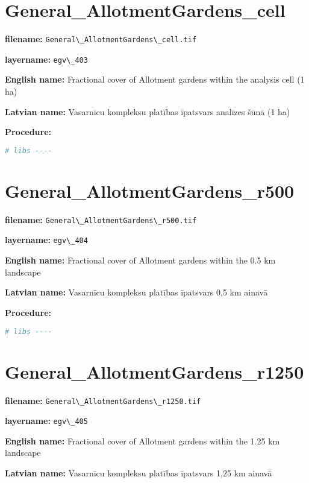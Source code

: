 \documentclass[
]{book}
\newcommand{\passthrough}[1]{#1}
\begin{document}
\section{General\_AllotmentGardens\_cell}\label{ch06.403}

\textbf{filename:} \passthrough{\lstinline!General\_AllotmentGardens\_cell.tif!}

\textbf{layername:} \passthrough{\lstinline!egv\_403!}

\textbf{English name:} Fractional cover of Allotment gardens within the analysis cell (1 ha)

\textbf{Latvian name:} Vasarnīcu kompleksu platības īpatsvars analīzes šūnā (1 ha)

\textbf{Procedure:}

\begin{lstlisting}[language=R]
# libs ----
\end{lstlisting}

\section{General\_AllotmentGardens\_r500}\label{ch06.404}

\textbf{filename:} \passthrough{\lstinline!General\_AllotmentGardens\_r500.tif!}

\textbf{layername:} \passthrough{\lstinline!egv\_404!}

\textbf{English name:} Fractional cover of Allotment gardens within the 0.5 km landscape

\textbf{Latvian name:} Vasarnīcu kompleksu platības īpatsvars 0,5 km ainavā

\textbf{Procedure:}

\begin{lstlisting}[language=R]
# libs ----
\end{lstlisting}

\section{General\_AllotmentGardens\_r1250}\label{ch06.405}

\textbf{filename:} \passthrough{\lstinline!General\_AllotmentGardens\_r1250.tif!}

\textbf{layername:} \passthrough{\lstinline!egv\_405!}

\textbf{English name:} Fractional cover of Allotment gardens within the 1.25 km landscape

\textbf{Latvian name:} Vasarnīcu kompleksu platības īpatsvars 1,25 km ainavā
\end{document}
